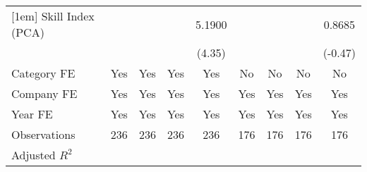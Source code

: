 {\begin{tabular}{l*{8}{c}}
[1em]
Skill Index (PCA)                  &                     &                     &                     &      5.1900\sym{***}&                     &                     &                     &      0.8685         \\
                                   &                     &                     &                     &      (4.35)         &                     &                     &                     &     (-0.47)         \\
[1em]
Category FE                        &         Yes         &         Yes         &         Yes         &         Yes         &          No         &          No         &          No         &          No         \\
[1em]
Company FE                         &         Yes         &         Yes         &         Yes         &         Yes         &         Yes         &         Yes         &         Yes         &         Yes         \\
[1em]
Year FE                            &         Yes         &         Yes         &         Yes         &         Yes         &         Yes         &         Yes         &         Yes         &         Yes         \\
\hline
Observations                       &         236         &         236         &         236         &         236         &         176         &         176         &         176         &         176         \\
Adjusted \(R^{2}\)                 &                     &                     &                     &                     &                     &                     &                     &                     \\
\hline\hline
\end{tabular}
}
